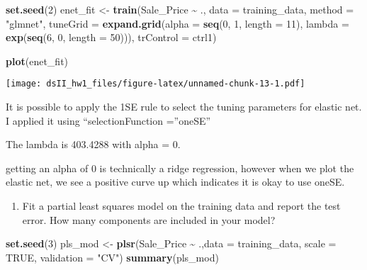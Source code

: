 \documentclass[
]{article}
\newenvironment{Shaded}{\begin{snugshade}}{\end{snugshade}}
\newcommand{\AttributeTok}[1]{\textcolor[rgb]{0.13,0.29,0.53}{#1}}
\newcommand{\ConstantTok}[1]{\textcolor[rgb]{0.56,0.35,0.01}{#1}}
\newcommand{\DecValTok}[1]{\textcolor[rgb]{0.00,0.00,0.81}{#1}}
\newcommand{\FunctionTok}[1]{\textcolor[rgb]{0.13,0.29,0.53}{\textbf{#1}}}
\newcommand{\NormalTok}[1]{#1}
\newcommand{\OtherTok}[1]{\textcolor[rgb]{0.56,0.35,0.01}{#1}}
\newcommand{\SpecialCharTok}[1]{\textcolor[rgb]{0.81,0.36,0.00}{\textbf{#1}}}
\newcommand{\StringTok}[1]{\textcolor[rgb]{0.31,0.60,0.02}{#1}}
\providecommand{\tightlist}{%
  \setlength{\itemsep}{0pt}\setlength{\parskip}{0pt}}
\begin{document}
\begin{Shaded}
\begin{Highlighting}[]
\FunctionTok{set.seed}\NormalTok{(}\DecValTok{2}\NormalTok{)}
\NormalTok{enet\_fit }\OtherTok{\textless{}{-}} \FunctionTok{train}\NormalTok{(Sale\_Price }\SpecialCharTok{\textasciitilde{}}\NormalTok{ ., }\AttributeTok{data =}\NormalTok{ training\_data,}
                  \AttributeTok{method =} \StringTok{"glmnet"}\NormalTok{, }\AttributeTok{tuneGrid =} \FunctionTok{expand.grid}\NormalTok{(}\AttributeTok{alpha =} \FunctionTok{seq}\NormalTok{(}\DecValTok{0}\NormalTok{, }\DecValTok{1}\NormalTok{, }\AttributeTok{length =} \DecValTok{11}\NormalTok{),}
\AttributeTok{lambda =} \FunctionTok{exp}\NormalTok{(}\FunctionTok{seq}\NormalTok{(}\DecValTok{6}\NormalTok{, }\DecValTok{0}\NormalTok{, }\AttributeTok{length =} \DecValTok{50}\NormalTok{))),}
\AttributeTok{trControl =}\NormalTok{ ctrl1)}
\end{Highlighting}
\end{Shaded}

\begin{Shaded}
\begin{Highlighting}[]
\FunctionTok{plot}\NormalTok{(enet\_fit)}
\end{Highlighting}
\end{Shaded}

\texttt{[image: dsII\_hw1\_files/figure-latex/unnamed-chunk-13-1.pdf]}

It is possible to apply the 1SE rule to select the tuning parameters for
elastic net. I applied it using ``selectionFunction =''oneSE''

The lambda is 403.4288 with alpha = 0.

getting an alpha of 0 is technically a ridge regression, however when we
plot the elastic net, we see a positive curve up which indicates it is
okay to use oneSE.

\begin{enumerate}
\def\labelenumi{(\alph{enumi})}
\setcounter{enumi}{2}
\tightlist
\item
  Fit a partial least squares model on the training data and report the
  test error. How many components are included in your model?
\end{enumerate}

\begin{Shaded}
\begin{Highlighting}[]
\FunctionTok{set.seed}\NormalTok{(}\DecValTok{3}\NormalTok{)}
\NormalTok{pls\_mod }\OtherTok{\textless{}{-}} \FunctionTok{plsr}\NormalTok{(Sale\_Price }\SpecialCharTok{\textasciitilde{}}\NormalTok{ .,}\AttributeTok{data =}\NormalTok{ training\_data, }\AttributeTok{scale =} \ConstantTok{TRUE}\NormalTok{, }\AttributeTok{validation =} \StringTok{"CV"}\NormalTok{)}
\FunctionTok{summary}\NormalTok{(pls\_mod)}
\end{Highlighting}
\end{Shaded}
\end{document}

